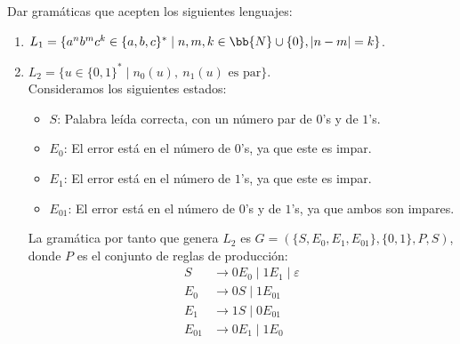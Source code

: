 \documentclass[12pt]{article}
\begin{document}
    \begin{ejercicio}
        Dar gramáticas que acepten los siguientes lenguajes:
        \begin{enumerate}
            \item $L_1 = \{a^nb^mc^k \in \{a,b,c\}^\ast \mid n,m,k\in \bb{N}\cup\{0\}, |n-m|=k\}$.
            \item $L_2 = \{u\in \{0,1\}^\ast \mid n_0(u),~n_1(u)\text{ es par}\}$.\\
            
            Consideramos los siguientes estados:
            \begin{itemize}
                \item $S$: Palabra leída correcta, con un número par de $0$'s y de $1$'s.
                \item $E_{0}$: El error está en el número de $0$'s, ya que este es impar.
                \item $E_{1}$: El error está en el número de $1$'s, ya que este es impar.
                \item $E_{01}$: El error está en el número de $0$'s y de $1$'s, ya que ambos son impares.
            \end{itemize}

            La gramática por tanto que genera $L_2$ es $G=(\{S,E_0,E_1,E_{01}\},\{0,1\},P,S)$, donde $P$ es el conjunto de reglas de producción:
            \begin{align*}
                S &\rightarrow 0E_0 \mid 1E_1 \mid \varepsilon\\
                E_0 &\rightarrow 0S \mid 1E_{01}\\
                E_1 &\rightarrow 1S \mid 0E_{01}\\
                E_{01} &\rightarrow 0E_1 \mid 1E_0
            \end{align*}
        \end{enumerate}
    \end{ejercicio}
\end{document}
